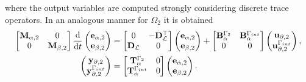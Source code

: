 \documentclass[11pt,a4paper]{article}
\begin{document}
where the output variables are computed strongly considering discrete trace operators. In an analogous manner for $\Omega_2$ it is obtained
\begin{equation}
    \begin{aligned}
        \begin{bmatrix}
            \mathbf{M}_{\alpha, 2} & 0 \\
            0 & \mathbf{M}_{\beta,2}
        \end{bmatrix}
        \odv{}{t}
        \begin{pmatrix}
            \mathbf{e}_{\alpha,2} \\
            \mathbf{e}_{\beta,2}
        \end{pmatrix} &= 
        \begin{bmatrix}
            0 & -\mathbf{D}_{\mathcal{L}}^\top \\
            \mathbf{D}_{\mathcal{L}} & 0 
        \end{bmatrix}
        \begin{pmatrix}
            \mathbf{e}_{\alpha,2} \\
            \mathbf{e}_{\beta,2}
        \end{pmatrix} + 
        \begin{bmatrix}
            \mathbf{B}_{\alpha}^{\Gamma_2} & \mathbf{B}_{\alpha}^{\Gamma_{\rm int}} \\
            0 & 0
        \end{bmatrix}
        \begin{pmatrix}
            \mathbf{u}_{\partial,2} \\
            \mathbf{u}_{\partial,2}^{\Gamma_{\rm int}}
        \end{pmatrix}, \\
        \begin{pmatrix}
            \mathbf{y}_{\partial,2} \\
            \mathbf{y}_{\partial,2}^{\Gamma_{\rm int}}
        \end{pmatrix} &= 
        \begin{bmatrix}
            \mathbf{T}_{\alpha}^{\Gamma_2} & 0 \\
            \mathbf{T}_{\alpha}^{\Gamma_{\rm int}} & 0
        \end{bmatrix}
        \begin{pmatrix}
            \mathbf{e}_{\alpha,2} \\
            \mathbf{e}_{\beta,2}
        \end{pmatrix}.
    \end{aligned}
\label{eq:pH-system-L}
\end{equation}
\end{document}
